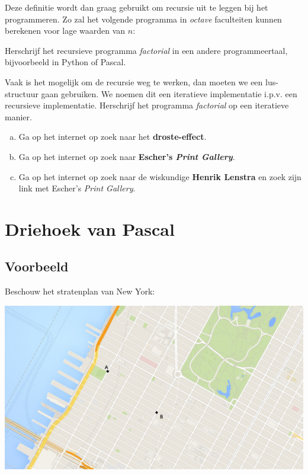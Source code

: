 \documentclass[12pt,a4paper,twoside]{article}
\begin{document}
Deze definitie wordt dan graag gebruikt om recursie uit te leggen bij het programmeren. Zo zal het volgende programma in {\em octave} faculteiten kunnen berekenen voor lage waarden van $n$:



\begin{oefening}
Herschrijf het recursieve programma {\em factorial} in een andere programmeertaal, bijvoorbeeld in Python of Pascal.
\end{oefening}

\begin{oefening}
Vaak is het mogelijk om de recursie weg te werken, dan moeten we een lus-structuur gaan gebruiken. We noemen dit een iteratieve implementatie i.p.v. een recursieve implementatie. Herschrijf het programma {\em factorial} op een iteratieve manier.
\end{oefening}

\begin{oefening}
\begin{enumerate}[(a)]
\item Ga op het internet op zoek naar het {\bf droste-effect}.
\item Ga op het internet op zoek naar {\bf Escher's {\em Print Gallery}}.
\item Ga op het internet op zoek naar de wiskundige {\bf Henrik Lenstra} en zoek zijn link met Escher's {\em Print Gallery}.
\end{enumerate}
\end{oefening}

\cleardoublepage
\section{Driehoek van Pascal}

\subsection{Voorbeeld}

Beschouw het stratenplan van New York:
\begin{center}
\includegraphics[width=1\textwidth]{NY_grid}
\end{center}
\end{document}
